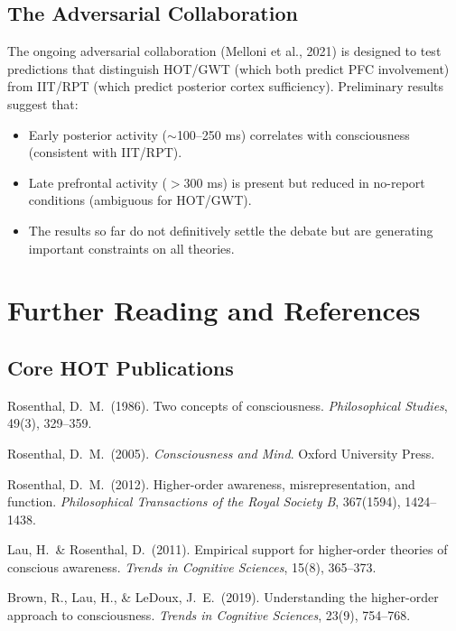 \documentclass[11pt,a4paper]{report}
\begin{document}
\section{The Adversarial Collaboration}

The ongoing adversarial collaboration (Melloni et al., 2021) is designed to test predictions that distinguish HOT/GWT (which both predict PFC involvement) from IIT/RPT (which predict posterior cortex sufficiency). Preliminary results suggest that:
\begin{itemize}[leftmargin=1.5em]
  \item Early posterior activity ($\sim$100--250 ms) correlates with consciousness (consistent with IIT/RPT).
  \item Late prefrontal activity ($>$300 ms) is present but reduced in no-report conditions (ambiguous for HOT/GWT).
  \item The results so far do not definitively settle the debate but are generating important constraints on all theories.
\end{itemize}


\chapter{Further Reading and References}

\section*{Core HOT Publications}
\begin{enumerate}[label={[\arabic*]}, leftmargin=2.5em]
  \item Rosenthal, D.\ M.\ (1986). Two concepts of consciousness. \textit{Philosophical Studies}, 49(3), 329--359.
  \item Rosenthal, D.\ M.\ (2005). \textit{Consciousness and Mind}. Oxford University Press.
  \item Rosenthal, D.\ M.\ (2012). Higher-order awareness, misrepresentation, and function. \textit{Philosophical Transactions of the Royal Society B}, 367(1594), 1424--1438.
  \item Lau, H.\ \& Rosenthal, D.\ (2011). Empirical support for higher-order theories of conscious awareness. \textit{Trends in Cognitive Sciences}, 15(8), 365--373.
  \item Brown, R., Lau, H., \& LeDoux, J.\ E.\ (2019). Understanding the higher-order approach to consciousness. \textit{Trends in Cognitive Sciences}, 23(9), 754--768.
\end{enumerate}
\end{document}
